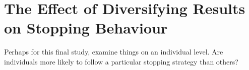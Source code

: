 
\chapter{The Effect of Diversifying Results on Stopping Behaviour}\label{chap:diversity}
Perhaps for this final study, examine things on an individual level. Are individuals more likely to follow a particular stopping strategy than others?
